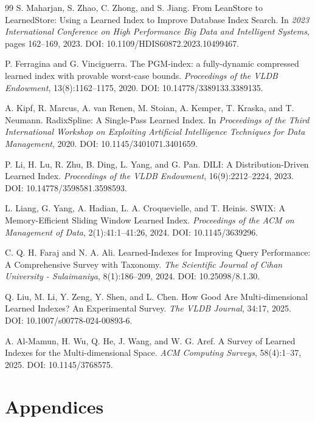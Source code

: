 \documentclass[a4paper, 12pt, twoside]{report}
\begin{document}
\begin{thebibliography}{99}
   S. Maharjan, S. Zhao, C. Zhong, and S. Jiang.
   From LeanStore to LearnedStore: Using a Learned Index to Improve Database Index Search.
   In \textit{2023 International Conference on High Performance Big Data and Intelligent Systems}, pages 162--169, 2023.
   DOI: 10.1109/HDIS60872.2023.10499467.

   P. Ferragina and G. Vinciguerra.
   The PGM-index: a fully-dynamic compressed learned index with provable worst-case bounds.
   \textit{Proceedings of the VLDB Endowment}, 13(8):1162--1175, 2020.
   DOI: 10.14778/3389133.3389135.

   A. Kipf, R. Marcus, A. van Renen, M. Stoian, A. Kemper, T. Kraska, and T. Neumann.
   RadixSpline: A Single-Pass Learned Index.
   In \textit{Proceedings of the Third International Workshop on Exploiting Artificial Intelligence Techniques for Data Management}, 2020.
   DOI: 10.1145/3401071.3401659.

   P. Li, H. Lu, R. Zhu, B. Ding, L. Yang, and G. Pan.
   DILI: A Distribution-Driven Learned Index.
   \textit{Proceedings of the VLDB Endowment}, 16(9):2212--2224, 2023.
   DOI: 10.14778/3598581.3598593.

   L. Liang, G. Yang, A. Hadian, L. A. Croquevielle, and T. Heinis.
   SWIX: A Memory-Efficient Sliding Window Learned Index.
   \textit{Proceedings of the ACM on Management of Data}, 2(1):41:1--41:26, 2024.
   DOI: 10.1145/3639296.

   C. Q. H. Faraj and N. A. Ali.
   Learned-Indexes for Improving Query Performance: A Comprehensive Survey with Taxonomy.
   \textit{The Scientific Journal of Cihan University - Sulaimaniya}, 8(1):186--209, 2024.
   DOI: 10.25098/8.1.30.

   Q. Liu, M. Li, Y. Zeng, Y. Shen, and L. Chen.
   How Good Are Multi-dimensional Learned Indexes? An Experimental Survey.
   \textit{The VLDB Journal}, 34:17, 2025.
   DOI: 10.1007/s00778-024-00893-6.

   A. Al-Mamun, H. Wu, Q. He, J. Wang, and W. G. Aref.
   A Survey of Learned Indexes for the Multi-dimensional Space.
   \textit{ACM Computing Surveys}, 58(4):1--37, 2025.
   DOI: 10.1145/3768575.
\end{thebibliography}

\chapter{Appendices}
\appendix
\makeatletter
\def\@seccntformat#1{Appendix~\csname the#1\endcsname:\quad}
\makeatother
\end{document}
